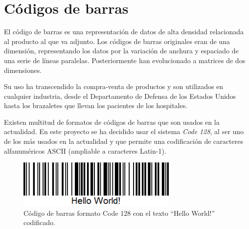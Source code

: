 \section{Códigos de barras}
El código de barras es una representación de datos de alta densidad relacionada al producto al que va adjunto. Los códigos de barras originales eran de una dimensión, representando los datos por la variación de anchura y espaciado de una serie de líneas paralelas. Posteriormente han evolucionado a matrices de dos dimensiones.

Su uso ha transcendido la compra-venta de productos y son utilizados en cualquier industria, desde el Departamento de Defensa de los Estados Unidos hasta los brazaletes que llevan los pacientes de los hospitales.

Existen multitud de formatos de códigos de barras que son usados en la actualidad. En este proyecto se ha decidido usar el sistema \textit{Code 128}, al ser uno de los más usados en la actualidad y que permite una codificación de caracteres alfanuméricos ASCII (ampliable a caracteres Latin-1).

\begin{figure}[h]
	\centering
		\includegraphics[width=0.7\textwidth]{./img/barcode.png}
	\caption{Código de barras formato Code 128 con el texto ``Hello World!'' codificado.}
\end{figure}

\chapterend